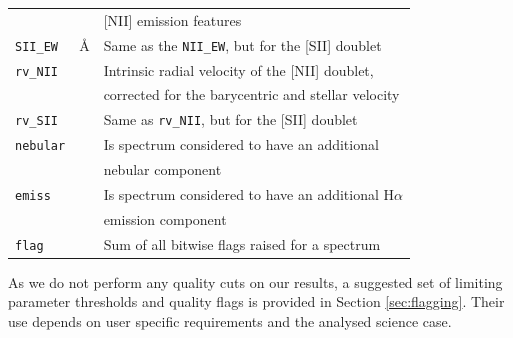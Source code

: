 \begin{table}
\begin{tabular}{l c l}
		& & [NII] emission features \\
		\texttt{SII\_EW} & \AA & Same as the \texttt{NII\_EW}, but for the [SII] doublet \\
		\texttt{rv\_NII} & \kms & Intrinsic radial velocity of the [NII] doublet, \\
		& & corrected for the barycentric and stellar velocity \\
		\texttt{rv\_SII} & \kms & Same as \texttt{rv\_NII}, but for the [SII] doublet \\
		\texttt{nebular} & & Is spectrum considered to have an additional \\
		& & nebular component \\
		\texttt{emiss} & & Is spectrum considered to have an additional H$\alpha$ \\
		& & emission component \\
		\texttt{flag} & & Sum of all bitwise flags raised for a spectrum \\
		\hline
	\end{tabular}
\end{table}

As we do not perform any quality cuts on our results, a suggested set of limiting parameter thresholds and quality flags is provided in Section \ref{sec:flagging}. Their use depends on user specific requirements and the analysed science case.

